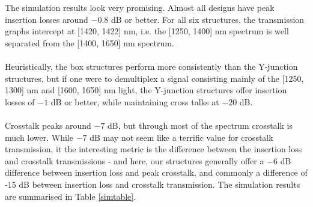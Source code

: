 The simulation results look very promising. Almost all designs have peak insertion losses around $-0.8$ dB or better. For all six structures, the transmission graphs intercept at [1420, 1422] nm, i.e. the [1250, 1400] nm spectrum is well separated from the [1400, 1650] nm spectrum. \\
\\
Heuristically, the box structures perform more consistently than the Y-junction structures, but if one were to demultiplex a signal consisting mainly of the [1250, 1300] nm and [1600, 1650] nm light, the Y-junction structures offer insertion losses of $-1$ dB or better, while maintaining cross talks at $-20$ dB.\\
\\
Crosstalk peaks around $-7$ dB, but through most of the spectrum crosstalk is much lower. While $-7$ dB may not seem like a terrific value for crosstalk transmission, it the interesting metric is the difference between the insertion loss and crosstalk transmissions - and here, our structures generally offer a $-6$ dB difference between insertion loss and peak crosstalk, and commonly a difference of -15 dB between insertion loss and crosstalk transmission. The simulation results are summarised in Table \ref{simtable}.


